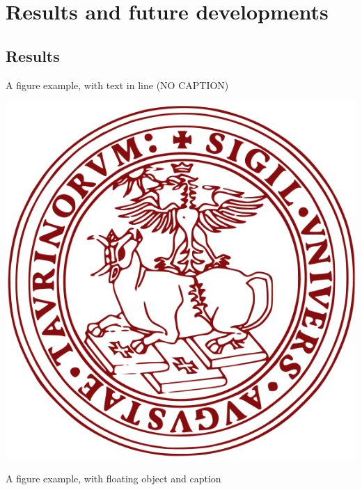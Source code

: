 \chapter[Results and future developments]{Results and future developments}

\section[Results]{Results}


A figure example, with text in line (NO CAPTION)
\begin{center}

\includegraphics[scale=0.15]{head/logo.png}


\end{center}

A figure example, with floating object and caption

